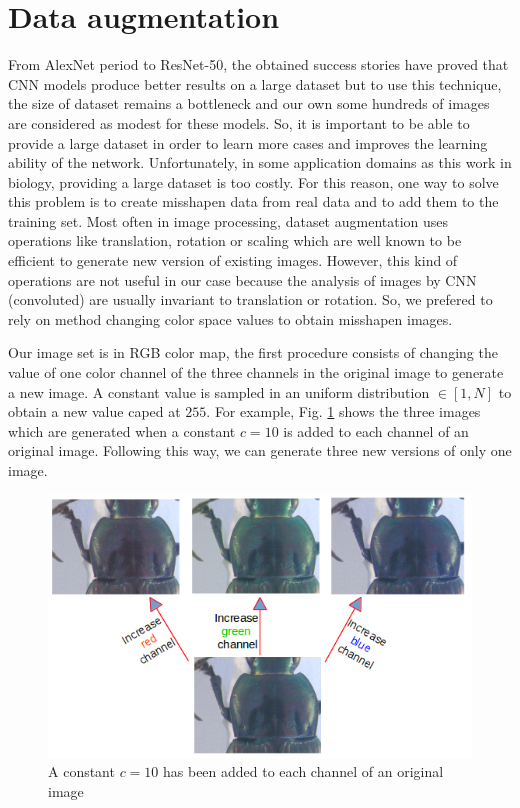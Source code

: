 \documentclass[review]{elsarticle}
\begin{document}
\section{Data augmentation}
\label{Sdataaug}
From AlexNet period to ResNet-50, the obtained success stories \cite{krizhevsky2012imagenet,he2016deep} have proved that CNN models produce better results on a large dataset but to use this technique, the size of dataset remains a bottleneck and our own some hundreds of images are considered as modest for these models. So, it is important to be able to provide a large dataset in order to learn more cases and improves the learning ability of the network. Unfortunately, in some application domains as this work in biology, providing a large dataset is too costly. For this reason, one way to solve this problem is to create misshapen data from real data and to add them to the training set. Most often in image processing, dataset augmentation uses operations like translation, rotation or scaling which are well known to be efficient to generate new version of existing images. However, this kind of operations are not useful in our case because the analysis of images by CNN (convoluted) are usually invariant to translation or rotation. So, we prefered to rely on method changing color space values to obtain misshapen images.

Our image set is in RGB color map, the first procedure consists of changing the value of one color channel of the three channels in the original image to generate a new image. A constant value is sampled in an uniform distribution $\in [1, N]$ to obtain a new value caped at $255$. For example, Fig. \ref{figaug1} shows the three images which are generated  when a constant $c = 10$ is added to each channel of an original image. Following this way, we can generate three new versions of only one image.

\begin{figure}[h]
	\centering
	\includegraphics[scale=0.4]{images/inc_channels}
	\caption{A constant $c = 10$ has been added to each channel of an original image}
	\label{figaug1}
\end{figure}
\end{document}
